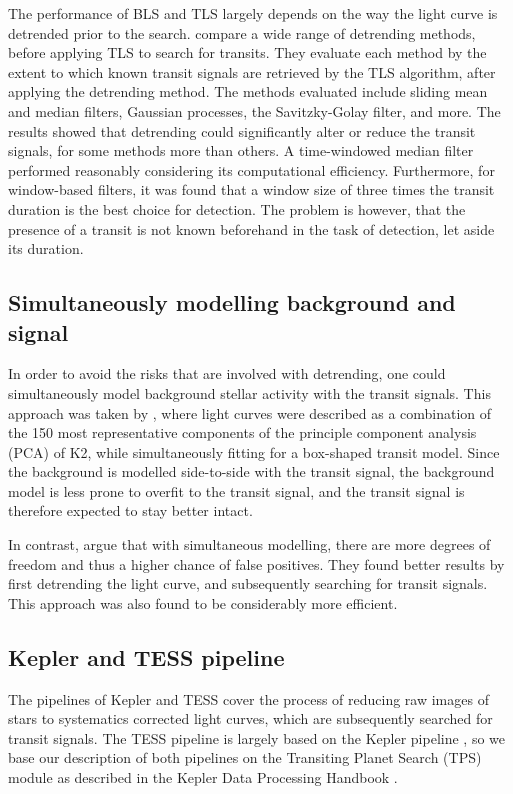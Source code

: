The performance of BLS and TLS largely depends on the way the light curve is detrended prior to the search. \cite{hippke2019wotan} compare a wide range of detrending methods, before applying TLS to search for transits. They evaluate each method by the extent to which known transit signals are retrieved by the TLS algorithm, after applying the detrending method. The methods evaluated include sliding mean and median filters, Gaussian processes, the Savitzky-Golay filter, and more. The results showed that detrending could significantly alter or reduce the transit signals, for some methods more than others. A time-windowed median filter performed reasonably considering its computational efficiency. Furthermore, for window-based filters, it was found that a window size of three times the transit duration is the best choice for detection. The problem is however, that the presence of a transit is not known beforehand in the task of detection, let aside its duration.

\subsection{Simultaneously modelling background and signal}

In order to avoid the risks that are involved with detrending, one could simultaneously model background stellar activity with the transit signals. This approach was taken by \cite{foreman2015systematic}, where light curves were described as a combination of the 150 most representative components of the principle component analysis (PCA) of K2, while simultaneously fitting for a box-shaped transit model. Since the background is modelled side-to-side with the transit signal, the background model is less prone to overfit to the transit signal, and the transit signal is therefore expected to stay better intact.

In contrast, \cite{kovacs2016periodic} argue that with simultaneous modelling, there are more degrees of freedom and thus a higher chance of false positives. They found better results by first detrending the light curve, and subsequently searching for transit signals. This approach was also found to be considerably more efficient.

\subsection{Kepler and TESS pipeline}

The pipelines of Kepler and TESS cover the process of reducing raw images of stars to systematics corrected light curves, which are subsequently searched for transit signals. The TESS pipeline is largely based on the Kepler pipeline \citep{jenkins2016tess}, so we base our description of both pipelines on the Transiting Planet Search (TPS) module as described in the Kepler Data Processing Handbook \cite{jenkins2017kepler}. 

